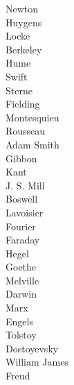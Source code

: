 \begin{multicols}{4}
Newton\\
Huygens\\
Locke\\
Berkeley\\
Hume\\
Swift\\
Sterne\\
Fielding\\
Montesquieu\\
Rousseau\\
Adam Smith\\
Gibbon\\
Kant\\
J. S. Mill\\
Boswell\\
Lavoisier\\
Fourier\\
Faraday\\
Hegel\\
Goethe\\
Melville\\
Darwin\\
Marx\\
Engels\\
Tolstoy\\
Dostoyevsky\\
William James\\
Freud
\end{multicols}
\clearpage





